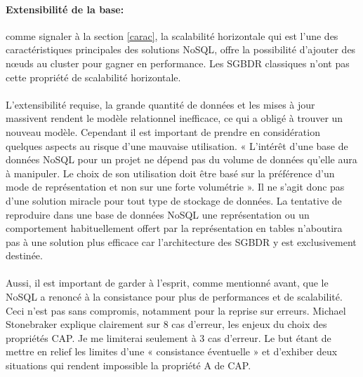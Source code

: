 \paragraph{Extensibilité de la base:} comme signaler à la section \ref{carac}, 
la scalabilité horizontale qui est l'une des caractéristiques principales 
des solutions \textsf{NoSQL}, offre la possibilité 
d'ajouter des nœuds au cluster pour gagner en performance. Les \textsf{SGBDR} classiques 
n'ont pas cette propriété de scalabilité horizontale.
\\ 
\\ 
L'extensibilité requise, la grande quantité de données
et les mises à jour massivent rendent le modèle relationnel inefficace, ce qui a
obligé à trouver un nouveau modèle. Cependant il est important de prendre en
considération quelques aspects au risque d'une mauvaise utilisation. «
L'intérêt d'une base de données \textsf{NoSQL} pour un projet ne
dépend pas du volume de données qu'elle aura à manipuler. Le choix de
son utilisation doit être basé sur la préférence d’un mode de
représentation et non sur une forte volumétrie
»\cite{NoSQLeurope}. Il ne s’agit donc pas d’une solution
miracle pour tout type de stockage de données.  La tentative de
reproduire dans une base de données \textsf{NoSQL} une représentation
ou un comportement habituellement offert par la représentation en tables
n'aboutira pas à une solution plus efficace car l'architecture des 
\textsf{SGBDR} y est exclusivement destinée.
\\
\\
Aussi, il est important de garder à l'esprit, comme mentionné avant, 
que le \textsf{NoSQL} a renoncé à la consistance
pour plus de performances et de scalabilité. Ceci n'est pas sans compromis, notamment 
pour la reprise sur erreurs. 
\textsf{Michael Stonebraker} explique clairement sur 8 cas d'erreur,  
les enjeux du choix
des propriétés \textsf{CAP}\cite{MichaelStonebraker2}. Je me limiterai seulement à
3 cas d'erreur. Le but étant de mettre en relief les limites d'une « \textsf{consistance éventuelle} »
et d'exhiber deux situations qui rendent impossible la propriété \textsf{A} de \textsf{CAP}.
\def\exempleA{We assume a typical hardware model of a
collection of local processing and storage nodes assembled into a cluster using LAN networking.
The clusters, in turn, are wired together using WAN networking.
Let’s start with a discussion of what causes errors in databases:}


